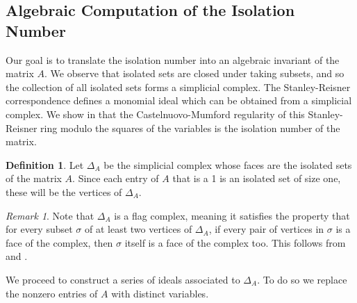 \documentclass[11pt,letterpaper, reqno]{amsart}
\theoremstyle{definition}
\newtheorem{definition}[theorem]{Definition}
\theoremstyle{remark}
\newtheorem{remark}[theorem]{Remark}
\numberwithin{equation}{section}
\begin{document}
\subsection{Algebraic Computation of the Isolation Number}
Our goal is to translate the isolation number into an algebraic invariant of the matrix $A$. We observe that isolated sets are closed under taking subsets, and so the collection of all isolated sets forms a simplicial complex. The Stanley-Reisner correspondence defines a monomial ideal which can be obtained from a simplicial complex. We show in  that the Castelnuovo-Mumford regularity of this Stanley-Reisner ring modulo the squares of the variables is the isolation number of the matrix. 

\begin{definition}\label{def: Delta}
Let $\Delta_A$ be the simplicial complex whose faces are the isolated sets of the matrix $A$. Since each entry of $A$ that is a 1 is an isolated set of size one, these will be the vertices of $\Delta_A$.
\end{definition}

\begin{remark}
 Note that   $\Delta_A$ is a flag complex, meaning it satisfies the property that  for every subset $\sigma$ of at least two vertices of $\Delta_A$, if every pair of vertices in $\sigma$ is a face of the complex, then $\sigma$ itself is a face of  the complex too. This follows from  and .  %
\end{remark}

We proceed to construct a series of ideals associated to $\Delta_A$. To do so we replace the nonzero entries of $A$ with distinct variables.
\end{document}
